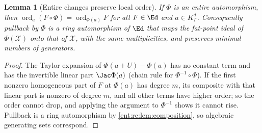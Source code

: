 \documentclass[11pt]{article}
\theoremstyle{plain}
\newtheorem{lemma}[lemma]{Lemma}
\theoremstyle{plain}
\theoremstyle{plain}
\theoremstyle{definition}
\theoremstyle{definition}
\theoremstyle{definition}
\theoremstyle{definition}
\theoremstyle{remark}
\newcommand{\K}{K_\Gamma}\newcommand{\KD}{K_\Delta}
\DeclareMathOperator{\ord}{ord}\DeclareMathOperator{\cf}{cf}
\begin{document}
\begin{lemma}[Entire changes preserve local order]
\label{ent:rc:lem:order-invariant}
If $\Phi$ is an entire automorphism, then
$\ord_a(F\circ\Phi)=\ord_{\Phi(a)}F$ for all $F\in\Ed$ and $a\in\K^d$.
Consequently pullback by $\Phi$ is a ring automorphism of $\Ed$ that maps the
fat-point ideal of $\Phi(\mathcal X)$ onto that of $\mathcal X$, with the same
multiplicities, and preserves minimal numbers of generators.
\end{lemma}
\begin{proof}
The Taylor expansion of $\Phi(a+U)-\Phi(a)$ has no constant term and has the
invertible linear part $\Jac\Phi(a)$ (chain rule for $\Phi^{-1}\circ\Phi$). If
the first nonzero homogeneous part of $F$ at $\Phi(a)$ has degree $m$, its
composite with that linear part is nonzero of degree $m$, and all other terms
have higher order; so the order cannot drop, and applying the argument to
$\Phi^{-1}$ shows it cannot rise. Pullback is a ring automorphism by
\cref{ent:rc:lem:composition}, so algebraic generating sets correspond.
\end{proof}
\end{document}
